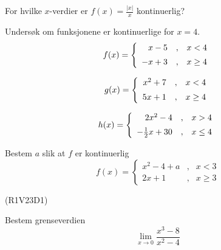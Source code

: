 





\opgt

For hvilke $ x $-verdier er $ f(x)=\frac{|x|}{x} $ kontinuerlig?

Undersøk om funksjonene er kontinuerlige for $ x=4 $.
\begin{equation*}
	f(x)= \left\lbrace{
		\begin{array}{rcr}
			x-5 &,&x<4 \br
			-x+3   &,& x\geq 4
		\end{array}
	}\right. 
\end{equation*}

\begin{equation*}
	g(x)= \left\lbrace{
		\begin{array}{rcr}
			x^2+7 &,&x<4 \br
			5x+1   &,& x\geq 4
		\end{array}
	}\right. 
\end{equation*}

\begin{equation*}
	h(x)= \left\lbrace{
		\begin{array}{rcr}
			2x^2-4 &,&x>4 \br
			-\frac{1}{2}x+30   &,& x\leq 4
		\end{array}
	}\right. 
\end{equation*}

Bestem $ a $ slik at $ f $ er kontinuerlig
\begin{equation*}
	f(x)= \left\lbrace{
		\begin{array}{rcr}
			x^2 - 4 + a &,& x < 3 \\
			2x + 1 & ,& x \geq 3
		\end{array}
	}\right. 
\end{equation*}

\newpage
{} (R1V23D1) \os

Bestem grenseverdien
\[ \lim\limits_{x\to0}\frac{x^3-8}{x^2-4} \]

